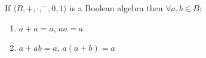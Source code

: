 If $\langle B, +, \cdot, ^-, 0, 1 \rangle$ is a Boolean algebra then $\forall a, b \in B$:
\begin{enumerate}
\item $a + a = a$, \quad $aa = a$ \qquad {}
\item $a + ab = a$, \quad $a(a + b) = a$ \qquad {}
\end{enumerate}
